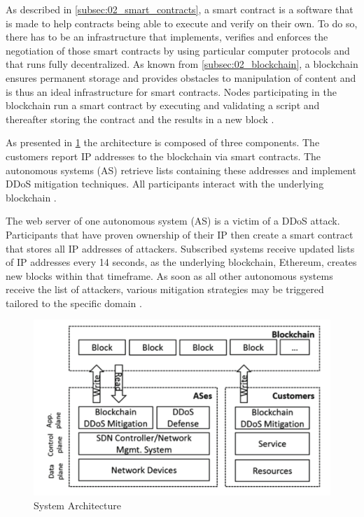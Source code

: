 As described in \ref{subsec:02_smart_contracts}, a smart contract is a software that is made to help contracts being able to execute and verify on their own. To do so, there has to be an infrastructure that implements, verifies and enforces the negotiation of those smart contracts by using particular computer protocols and that runs fully decentralized. As known from \ref{subsec:02_blockchain}, a blockchain ensures permanent storage and provides obstacles to manipulation of content and is thus an ideal infrastructure for smart contracts. Nodes participating in the blockchain run a smart contract by executing and validating a script and thereafter storing the contract and the results in a new block \cite{Rodrigues2017}.

As presented in \ref{system_architecture} the architecture is composed of three components. The customers report IP addresses to the blockchain via smart contracts. The autonomous systems (AS) retrieve lists containing these addresses and implement DDoS mitigation techniques. All participants interact with the underlying blockchain \cite{Rodrigues2017}.

The web server of one autonomous system (AS) is a victim of a DDoS attack. Participants that have proven ownership of their IP then create a smart contract that stores all IP addresses of attackers. Subscribed systems receive updated lists of IP addresses every 14 seconds, as the underlying blockchain, Ethereum, creates new blocks within that timeframe. As soon as all other autonomous systems receive the list of attackers, various mitigation strategies may be triggered tailored to the specific domain \cite{Rodrigues2017}.
\begin{figure}[ht]
  \begin{center}
    \includegraphics[scale=0.6]{Talk7/img/ddos/collaborative_ddos_mitigation_system_architecture}
  \end{center}
  \caption{System Architecture}
  \label{system_architecture}
\end{figure}

